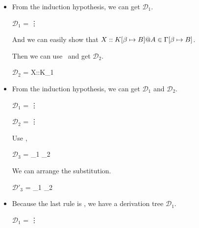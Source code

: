 \begin{itemize}
	\item \KVar
	      	      	      	      
	      From the induction hypothesis, we can get $\mathcal{D}_1$.
	      	      	      	      
	      $\mathcal{D}_1$ = 
	      {\vdots}
	      	      	      	      
	      And we can easily show that $X::K\SB@A \in \GG$.
	      	      	      	      
	      Then we can use \KVar\ and get $\mathcal{D}_2$.
	      	      	      	      
	      $\mathcal{D}_2$ = 
	      {X::K\SB@A \in \GG \andalso {}_1}
	      	      	      	      
	\item \KAbs
	      	      	      	      
	      From the induction hypothesis, we can get $\mathcal{D}_1$ and $\mathcal{D}_2$.
	      	      	      	      
	      $\mathcal{D}_1$ = 
	      {\vdots}
	      	      	      	      
	      $\mathcal{D}_2$ = 
	      {\vdots}
	      	      	      	      
	      Use \KAbs,
	      	      	      	      
	      $\mathcal{D}_3$ = 
	      {_1 \andalso {}_2}
	      	      	      	      
	      We can arrange the substitution.
	      	      	      	      
	      $\mathcal{D}'_3$ = 
	      {_1 \andalso {}_2}
	      	      	      	      
	\item \KApp
	      	      	      	      
	      Because the last rule is \KApp, we have a derivation tree $\mathcal{D}_1$.
	      	      	      	      
	      $\mathcal{D}_1$ = 
	      { \andalso
	      	{\vdots}}
	      	      	      	      

\end{itemize}

